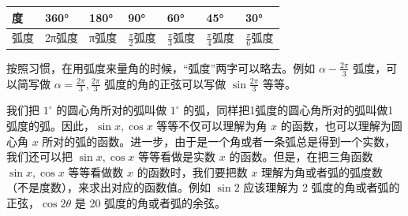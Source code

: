 {\def\LTcaptype{none} %
\begin{longtable}[]{@{}
  >{\raggedright\arraybackslash}p{}
  >{\raggedright\arraybackslash}p{}
  >{\raggedright\arraybackslash}p{}
  >{\raggedright\arraybackslash}p{}
  >{\raggedright\arraybackslash}p{}
  >{\raggedright\arraybackslash}p{}
  >{\raggedright\arraybackslash}p{}@{}}
\toprule\noalign{}
\begin{minipage}[b]{\linewidth}\raggedright
度
\end{minipage} & \begin{minipage}[b]{\linewidth}\raggedright
360°
\end{minipage} & \begin{minipage}[b]{\linewidth}\raggedright
180°
\end{minipage} & \begin{minipage}[b]{\linewidth}\raggedright
90°
\end{minipage} & \begin{minipage}[b]{\linewidth}\raggedright
60°
\end{minipage} & \begin{minipage}[b]{\linewidth}\raggedright
45°
\end{minipage} & \begin{minipage}[b]{\linewidth}\raggedright
30°
\end{minipage} \\
\midrule\noalign{}
\endhead
\bottomrule\noalign{}
\endlastfoot
弧度 & 2π弧度 & π弧度 & \(\frac{\pi}{2}\)弧度 & \(\frac{\pi}{3}\)弧度 &
\(\frac{\pi}{4}\)弧度 & \(\frac{\pi}{6}\)弧度 \\
\end{longtable}
}

按照习惯，在用弧度来量角的时候，``弧度''两字可以略去。例如
\(\alpha - \frac{2\pi}{3}\) 弧度，可以简写做
\(\alpha = \frac{2\pi}{3}, \frac{2\pi}{3}\) 弧度的角的正弦可以写做
\(\sin \frac{2\pi}{3}\) 等等。

我们把 \(1^{\circ}\) 的圆心角所对的弧叫做 \(1^{\circ}\)
的弧，同样把1弧度的圆心角所对的弧叫做1弧度的弧。因此，\(\sin x, \cos x\)
等等不仅可以理解为角 \(x\) 的函数，也可以理解为圆心角 \(x\)
所对的弧的函数。进一步，由于是一个角或者一条弧总是得到一个实数，我们还可以把
\(\sin x, \cos x\) 等等看做是实数 \(x\) 的函数。但是，在把三角函数
\(\sin x, \cos x\) 等等看做数 \(x\) 的函数时，我们要把数 \(x\)
理解为角或者弧的弧度数（不是度数），来求出对应的函数值。例如 \(\sin 2\)
应该理解为 2 弧度的角或者弧的正弦，\(\cos 2\theta\) 是 20
弧度的角或者弧的余弦。

